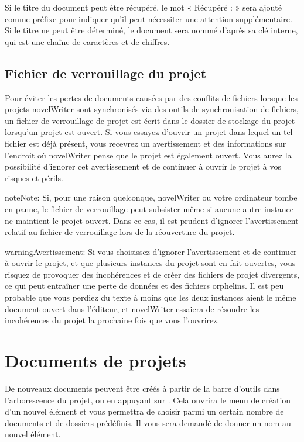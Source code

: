 \documentclass[a4paper,11pt,french]{sphinxmanual}
\begin{document}
\sphinxAtStartPar
Si le titre du document peut être récupéré, le mot « Récupéré : » sera ajouté comme préfixe pour indiquer qu’il peut nécessiter une attention supplémentaire. Si le titre ne peut être déterminé, le document sera nommé d’après sa clé interne, qui est une chaîne de caractères et de chiffres.


\subsection{Fichier de verrouillage du projet}
\label{\detokenize{project_overview:project-lockfile}}\label{\detokenize{project_overview:a-proj-roots-lock}}
\sphinxAtStartPar
Pour éviter les pertes de documents causées par des conflits de fichiers lorsque les projets novelWriter sont synchronisés via des outils de synchronisation de fichiers, un fichier de verrouillage de projet est écrit dans le dossier de stockage du projet lorsqu’un projet est ouvert. Si vous essayez d’ouvrir un projet dans lequel un tel fichier est déjà présent, vous recevrez un avertissement et des informations sur l’endroit où novelWriter pense que le projet est également ouvert. Vous aurez la possibilité d’ignorer cet avertissement et de continuer à ouvrir le projet à vos risques et périls.

\begin{sphinxadmonition}{note}{Note:}
\sphinxAtStartPar
Si, pour une raison quelconque, novelWriter ou votre ordinateur tombe en panne, le fichier de verrouillage peut subsister même si aucune autre instance ne maintient le projet ouvert. Dans ce cas, il est prudent d’ignorer l’avertissement relatif au fichier de verrouillage lors de la réouverture du projet.
\end{sphinxadmonition}

\begin{sphinxadmonition}{warning}{Avertissement:}
\sphinxAtStartPar
Si vous choisissez d’ignorer l’avertissement et de continuer à ouvrir le projet, et que plusieurs instances du projet sont en fait ouvertes, vous risquez de provoquer des incohérences et de créer des fichiers de projet divergents, ce qui peut entraîner une perte de données et des fichiers orphelins. Il est peu probable que vous perdiez du texte à moins que les deux instances aient le même document ouvert dans l’éditeur, et novelWriter essaiera de résoudre les incohérences du projet la prochaine fois que vous l’ouvrirez.
\end{sphinxadmonition}


\section{Documents de projets}
\label{\detokenize{project_overview:project-documents}}\label{\detokenize{project_overview:a-proj-files}}
\sphinxAtStartPar
De nouveaux documents peuvent être créés à partir de la barre d’outils dans l’arborescence du projet, ou en appuyant sur . Cela ouvrira le menu de création d’un nouvel élément et vous permettra de choisir parmi un certain nombre de documents et de dossiers prédéfinis. Il vous sera demandé de donner un nom au nouvel élément.
\end{document}

